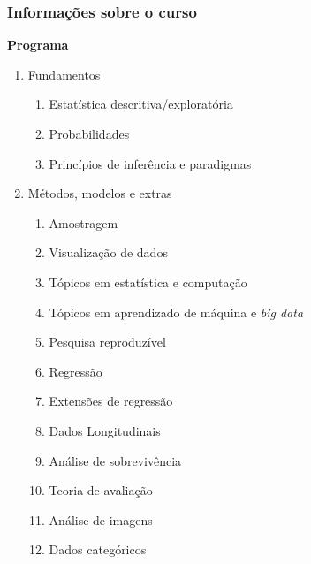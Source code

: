 \documentclass[handout,serif, professionalfont, usenames, dvipsnames, aspectratio = 169]{beamer}\usepackage[]{graphicx}\usepackage[]{color}
\begin{document}






\begin{frame}
\frametitle{Informações sobre o curso}
\textbf{Programa}
\begin{enumerate}
\item Fundamentos
  \begin{enumerate}
  \item Estatística descritiva/exploratória
  \item Probabilidades
  \item Princípios de inferência e paradigmas
  \end{enumerate}
\item Métodos, modelos e extras
  \begin{enumerate}
  \item Amostragem
  \item Visualização de dados
  \item Tópicos em estatística e computação
  \item Tópicos em aprendizado de máquina e {\it big data}
  \item Pesquisa reproduzível
  \item Regressão
  \item Extensões de regressão
  \item Dados Longitudinais
  \item Análise de sobrevivência
  \item Teoria de avaliação
  \item Análise de imagens
  \item Dados categóricos
  \end{enumerate}
\end{enumerate}

\end{frame}
\end{document}

